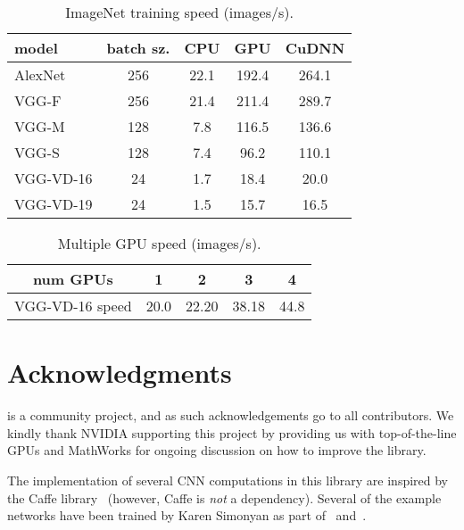 \begin{table}
\centering
\begin{tabular}{|lc|ccc|}
  \hline
  model     & batch sz. & CPU  & GPU   & CuDNN \\
  \hline
  AlexNet   & 256       & 22.1 & 192.4 & 264.1 \\
  VGG-F     & 256       & 21.4 & 211.4 & 289.7 \\
  VGG-M     & 128       & 7.8  & 116.5 & 136.6 \\
  VGG-S     & 128       & 7.4  & 96.2  & 110.1 \\
  VGG-VD-16 & 24        & 1.7  & 18.4  & 20.0  \\
  VGG-VD-19 & 24        & 1.5  & 15.7  & 16.5  \\
  \hline
\end{tabular}
\caption{ImageNet training speed (images/s).}
\label{f:speed}
\end{table}

\begin{table}
\centering
\begin{tabular}{|c|cccc|}
  \hline
  num GPUs     & 1  & 2 & 3 & 4 \\
  \hline
  VGG-VD-16 speed & 20.0 & 22.20 & 38.18 & 44.8 \\
  \hline
\end{tabular}
\caption{Multiple GPU speed (images/s).}
\label{f:mgpu}
\end{table}

\section{Acknowledgments}\label{s:ack}

\matconvnet is a community project, and as such acknowledgements go to all contributors. We kindly thank NVIDIA supporting this project by providing us with top-of-the-line GPUs and MathWorks for ongoing discussion on how to improve the library.

The implementation of several CNN computations in this library are inspired by the Caffe library~\cite{jia13caffe} (however, Caffe is \emph{not} a dependency). Several of the example networks have been trained by Karen Simonyan as part of~\cite{chatfield14return} and~\cite{simonyan15very}.
